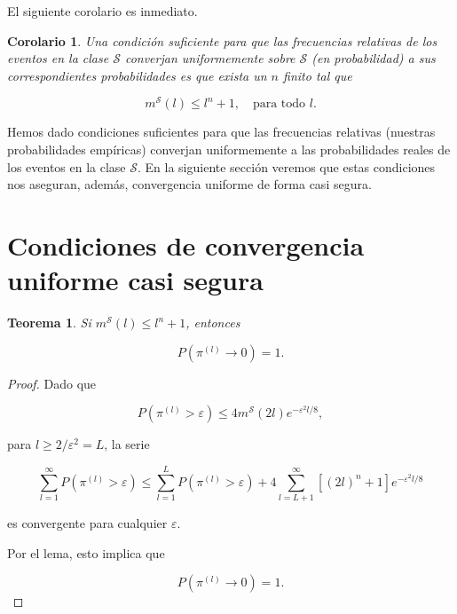 \documentclass{report}
\newtheorem{thm}{Teorema}[section]
\newtheorem{cor}{Corolario}[thm]
\begin{document}
El siguiente corolario es inmediato.\newline

\begin{cor}
Una condición suficiente para que las frecuencias relativas de los eventos en la clase \( \mathcal{S} \) converjan uniformemente sobre \( \mathcal{S} \) (en probabilidad) a sus correspondientes probabilidades es que exista un \( n \) finito tal que  

\[
m^{\mathcal{S}}(l) \leq l^n + 1, \quad \text{para todo } l.
\]
\end{cor}

\bigskip
Hemos dado condiciones suficientes para que las frecuencias relativas (nuestras probabilidades empíricas) converjan uniformemente a las 
probabilidades reales de los eventos en la clase \( \mathcal{S} \). En la siguiente sección veremos que estas condiciones nos aseguran, además, 
convergencia uniforme de forma casi segura.\newline

\section{Condiciones de convergencia uniforme casi segura}

\begin{thm}
    Si \( m^{\mathcal{S}}(l) \leq l^n + 1 \), entonces  

    \[
    P(\pi^{(l)} \to 0) = 1.
    \]
    
\end{thm} 

\begin{proof}

Dado que  

\[
P(\pi^{(l)} > \varepsilon) \leq 4 m^{\mathcal{S}}(2l)  e^{-\varepsilon^2 l/8},
\]

para \( l \geq 2 / \varepsilon^2 =L \), la serie  

\[
\sum_{l=1}^{\infty} P(\pi^{(l)} > \varepsilon) \leq \sum_{l=1}^{L} P(\pi^{(l)} > \varepsilon) + 4 \sum_{l=L+1}^{\infty} [(2l)^n + 1] e^{-\varepsilon^2 l/8}
\]

es convergente para cualquier \( \varepsilon \).  

Por el lema, esto implica que  

\[
P(\pi^{(l)} \to 0) = 1.
\]
\end{proof}
\end{document}
